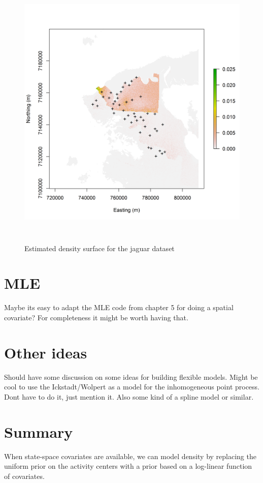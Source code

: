 \begin{figure}
\centering
\includegraphics[width=5in,height=5in]{figs/Dsurface34}
\label{ch9:fig:Dsurface}
\caption{Estimated density surface for the jaguar dataset}
\end{figure}









\section{MLE}

Maybe its easy to adapt the MLE code from chapter 5 for doing a
spatial covariate? For completeness it might be worth having that.

\section{Other ideas}

Should have some discussion on some ideas for building flexible
models. Might be cool to use the Ickstadt/Wolpert as a model for the
inhomogeneous point process. Dont have to do it, just mention it. Also
some kind of a spline model or similar.




\section{Summary}

When state-space covariates are available, we can model
density by replacing the uniform prior on the activity centers with a
prior based on a log-linear function of covariates.




